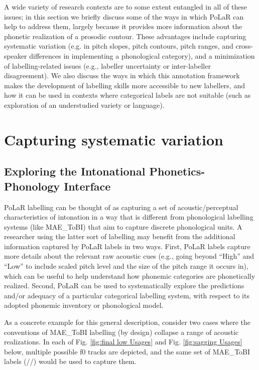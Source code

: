 \documentclass[11pt, twoside]{memoir}
\def\textlabel#1{{\relsize{-.5}\fontspec[Mapping=tex-text]{Roboto Mono}{#1}}}
\begin{document}
A wide variety of research contexts are to some extent entangled in all of these issues; in this section we briefly discuss some of the ways in which PoLaR can help to address them, largely because it provides more information about the phonetic realization of a prosodic contour. These advantages include capturing systematic variation (e.g. in pitch slopes, pitch contours, pitch ranges, and cross-speaker differences in implementing a phonological category), and a minimization of labelling-related issues (e.g., labeller uncertainty or inter-labeller disagreement). We also discuss the ways in which this annotation framework makes the development of labelling skills more accessible to new labellers, and how it can be used in contexts where categorical labels are not suitable (such as exploration of an understudied variety or language). 


\section{Capturing systematic variation}\label{sec:capturing-systematic-variation}

\subsection{Exploring the Intonational Phonetics-Phonology Interface}\label{sec:exploring-phonetics-phonology-interface}
PoLaR labelling can be thought of as capturing a set of acoustic\slash perceptual characteristics of intonation in a way that is different from phonological labelling systems (like MAE\_ToBI) that aim to capture discrete phonological units. A researcher using the latter sort of labelling may benefit from the additional information captured by PoLaR labels in two ways. First, PoLaR labels capture more details about the relevant raw acoustic cues (e.g., going beyond “High” and “Low” to include scaled pitch level and the size of the pitch range it occurs in), which can be useful to help understand how phonemic categories are phonetically realized. Second, PoLaR can be used to systematically explore the predictions and/or adequacy of a particular categorical labelling system, with respect to its adopted phonemic inventory or phonological model.

As a concrete example for this general description, consider two cases where the conventions of MAE\_ToBI labelling (by design) collapse a range of acoustic realizations. In each of Fig. \ref{fig:final low Usages} and Fig. \ref{fig:sagging Usages} below, multiple possible f0 tracks are depicted, and the same set of MAE\_ToBI labels (/\textlabel{H* H* L-L\%}/) would be used to capture them.
\end{document}
